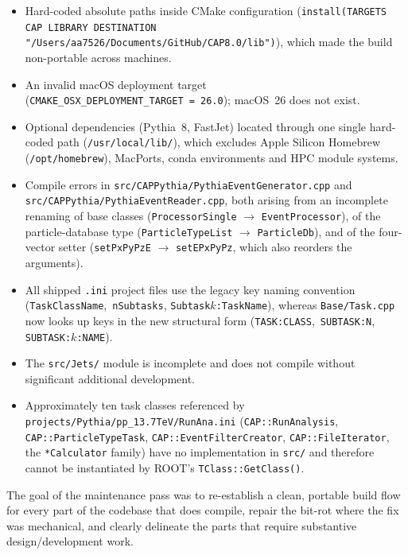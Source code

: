 \documentclass[11pt,a4paper]{article}
\begin{document}
\begin{itemize}
  \item Hard-coded absolute paths inside CMake configuration
        (\texttt{install(TARGETS CAP LIBRARY DESTINATION
        "/Users/aa7526/Documents/GitHub/CAP8.0/lib")}), which
        made the build non-portable across machines.
  \item An invalid macOS deployment target
        (\texttt{CMAKE\_OSX\_DEPLOYMENT\_TARGET~=~26.0}); macOS~26 does not
        exist.
  \item Optional dependencies (Pythia~8, FastJet) located through one
        single hard-coded path (\texttt{/usr/local/lib/}), which excludes
        Apple Silicon Homebrew (\texttt{/opt/homebrew}), MacPorts, conda
        environments and HPC module systems.
  \item Compile errors in \texttt{src/CAPPythia/PythiaEventGenerator.cpp}
        and \texttt{src/CAPPythia/PythiaEventReader.cpp}, both arising from
        an incomplete renaming of base classes
        (\texttt{ProcessorSingle} $\rightarrow$ \texttt{EventProcessor}),
        of the particle-database type
        (\texttt{ParticleTypeList} $\rightarrow$ \texttt{ParticleDb}),
        and of the four-vector setter
        (\texttt{setPxPyPzE} $\rightarrow$ \texttt{setEPxPyPz},
        which also reorders the arguments).
  \item All shipped \texttt{.ini} project files use the legacy key naming
        convention (\texttt{TaskClassName},~\texttt{nSubtasks},
        \texttt{Subtask$k$:TaskName}), whereas \texttt{Base/Task.cpp} now
        looks up keys in the new structural form
        (\texttt{TASK:CLASS},~\texttt{SUBTASK:N}, \texttt{SUBTASK:$k$:NAME}).
  \item The \texttt{src/Jets/} module is incomplete and does not compile
        without significant additional development.
  \item Approximately ten task classes referenced by
        \texttt{projects/Pythia/pp\_13.7TeV/RunAna.ini}
        (\texttt{CAP::RunAnalysis}, \texttt{CAP::ParticleTypeTask},
        \texttt{CAP::EventFilterCreator}, \texttt{CAP::FileIterator}, the
        \texttt{*Calculator} family) have no implementation in \texttt{src/}
        and therefore cannot be instantiated by ROOT's
        \texttt{TClass::GetClass()}.
\end{itemize}

The goal of the maintenance pass was to re-establish a clean, portable build
flow for every part of the codebase that does compile, repair the bit-rot
where the fix was mechanical, and clearly delineate the parts that require
substantive design/development work.
\end{document}
